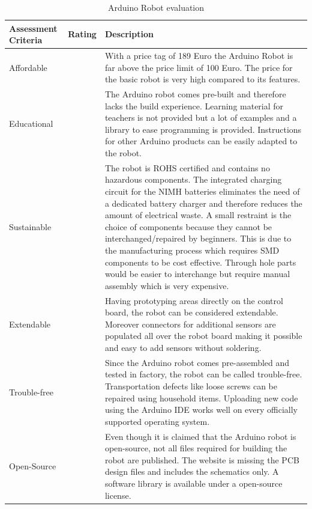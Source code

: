 \documentclass[11pt,a4paper]{article}
\newcounter{starnumber}
\newcommand{\stars}[1]{
  \forloop{starnumber}{1}{\value{starnumber} < 6}{
    \ifthenelse{#1 < \value{starnumber}}{\ding{73}}{\ding{72}}%
  }
}
\begin{document}
\begin{table}[h!]
\centering
\begin{tabular}{p{}p{}p{}}
\toprule
Assessment Criteria    & Rating & Description \\
\midrule
Affordable      & \stars{2}    & With a price tag of 189 Euro the Arduino Robot is far above the price limit of 100 Euro. The price for the basic robot is very high compared to its features.\\
Educational     & \stars{3}     & The Arduino robot comes pre-built and therefore lacks the build experience. Learning material for teachers is not provided but a lot of examples and a library to ease programming is provided. Instructions for other Arduino products can be easily adapted to the robot. \\
Sustainable       & \stars{4}     &  The robot is ROHS certified and contains no hazardous components. The integrated charging circuit for the NIMH batteries eliminates the need of a dedicated battery charger and therefore reduces the amount of electrical waste. A small restraint is the choice of components because they cannot be interchanged/repaired by beginners. This is due to the manufacturing process which requires SMD components to be cost effective. Through hole parts would be easier to interchange but require manual assembly which is very expensive.\\
Extendable & \stars{5}      &  Having prototyping areas directly on the control board, the robot can be considered extendable. Moreover connectors for additional sensors are populated all over the robot board making it possible and easy to add sensors without soldering.\\
Trouble-free & \stars{4} & Since the Arduino robot comes pre-assembled and tested in factory, the robot can be called trouble-free. Transportation defects like loose screws can be repaired using household items. Uploading new code using the Arduino IDE works well on every officially supported operating system.\\
Open-Source & \stars{3} & Even though it is claimed that the Arduino robot is open-source, not all files required for building the robot are published. The website is missing the PCB design files and includes the schematics only. A software library is available under a open-source license. \\
\bottomrule
\end{tabular}
\caption{Arduino Robot evaluation}
\label{tbl:arduinorobot_eval}
\end{table}
\end{document}
